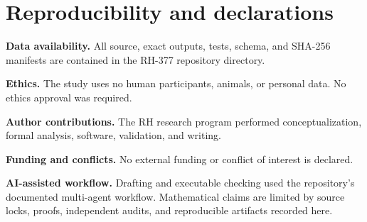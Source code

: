 \documentclass[11pt]{article}
\theoremstyle{definition}
\theoremstyle{remark}
\begin{document}
\section*{Reproducibility and declarations}

\textbf{Data availability.}  All source, exact outputs, tests, schema, and
SHA-256 manifests are contained in the RH-377 repository directory.

\textbf{Ethics.}  The study uses no human participants, animals, or personal
data.  No ethics approval was required.

\textbf{Author contributions.}  The RH research program performed
conceptualization, formal analysis, software, validation, and writing.

\textbf{Funding and conflicts.}  No external funding or conflict of interest
is declared.

\textbf{AI-assisted workflow.}  Drafting and executable checking used the
repository's documented multi-agent workflow.  Mathematical claims are
limited by source locks, proofs, independent audits, and reproducible
artifacts recorded here.



\end{document}
